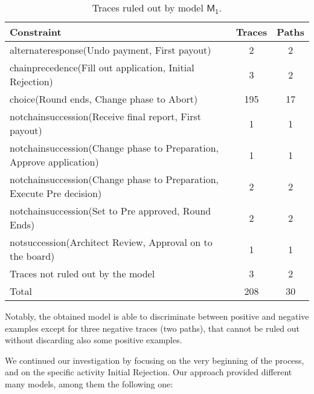 \begin{table}
\label{table:resultsModelM1}
\begin{center}
\begin{scriptsize}
\begin{tabular}{lcc}
Constraint & Traces & Paths \\
\hline
alternateresponse(Undo payment, First payout) & 2 & 2\\
chainprecedence(Fill out application, Initial Rejection) & 3 & 2\\
choice(Round ends, Change phase to Abort) & 195 & 17 \\
notchainsuccession(Receive final report, First payout) & 1 & 1 \\
notchainsuccession(Change phase to Preparation, Approve application) & 1 & 1\\
notchainsuccession(Change phase to Preparation, Execute Pre decision) & 2 & 2 \\
notchainsuccession(Set to Pre approved, Round Ends) & 2 & 2\\
notsuccession(Architect Review, Approval on to the board) & 1 & 1\\
\hline
Traces not ruled out by the model & 3 & 2 \\
\hline
Total & 208 & 30\\
\hline
\end{tabular}
\end{scriptsize}
\end{center}
\caption{Traces ruled out by model $\mathsf{M_1}$.}
\end{table}

Notably, the obtained model is able to discriminate between positive and negative examples except for three negative traces (two paths), that cannot be ruled out without discarding also some positive examples.

We continued our investigation by focusing on the very beginning of the process, and on the specific activity \textsf{Initial Rejection}. Our approach provided different many models, among them the following one:

